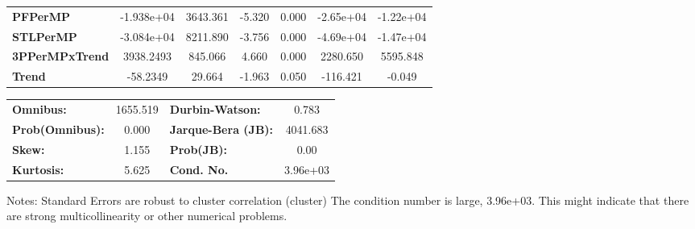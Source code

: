 \begin{center}
\begin{tabular}{lcccccc}
\textbf{PFPerMP}       &   -1.938e+04  &     3643.361     &    -5.320  &         0.000        &    -2.65e+04    &    -1.22e+04     \\
\textbf{STLPerMP}      &   -3.084e+04  &     8211.890     &    -3.756  &         0.000        &    -4.69e+04    &    -1.47e+04     \\
\textbf{3PPerMPxTrend} &    3938.2493  &      845.066     &     4.660  &         0.000        &     2280.650    &     5595.848     \\
\textbf{Trend}         &     -58.2349  &       29.664     &    -1.963  &         0.050        &     -116.421    &       -0.049     \\
\bottomrule
\end{tabular}
\begin{tabular}{lclc}
\textbf{Omnibus:}       & 1655.519 & \textbf{  Durbin-Watson:     } &    0.783  \\
\textbf{Prob(Omnibus):} &   0.000  & \textbf{  Jarque-Bera (JB):  } & 4041.683  \\
\textbf{Skew:}          &   1.155  & \textbf{  Prob(JB):          } &     0.00  \\
\textbf{Kurtosis:}      &   5.625  & \textbf{  Cond. No.          } & 3.96e+03  \\
\bottomrule
\end{tabular}
\end{center}

Notes: \newline
 [1] Standard Errors are robust to cluster correlation (cluster) \newline
 [2] The condition number is large, 3.96e+03. This might indicate that there are \newline
 strong multicollinearity or other numerical problems.